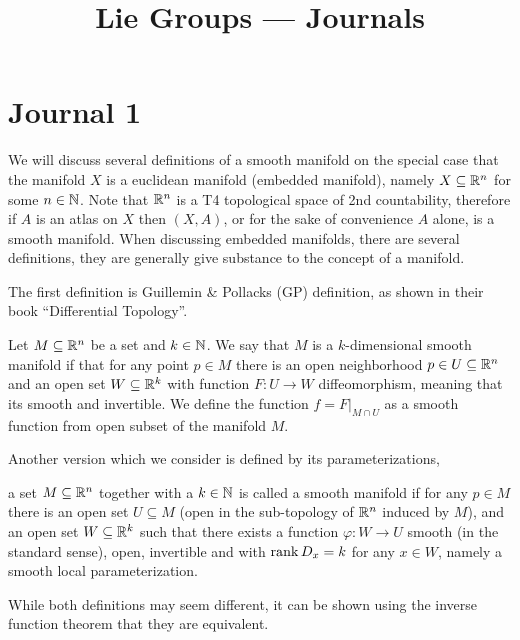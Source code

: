 
\title{Lie Groups --- Journals}
\setcounter{secnumdepth}{2}

\usepackage{fancyhdr}
\pagestyle{fancy}
\renewcommand{\headrulewidth}{0pt}

\DeclareMathOperator{\SU}{SU}


\maketitle
\maketitleprint[teal]{}

\section{Journal 1}
We will discuss several definitions of a smooth manifold on the special case that the manifold $X$ is a euclidean manifold (embedded manifold), namely $X \subseteq \mathbb{R}^n$ for some $n \in \mathbb{N}$.
Note that $\mathbb{R}^n$ is a T4 topological space of 2nd countability, therefore if $A$ is an atlas on $X$ then $(X, A)$, or for the sake of convenience $A$ alone, is a smooth manifold.
When discussing embedded manifolds, there are several definitions, they are generally give substance to the concept of a manifold.

The first definition is Guillemin \& Pollacks (GP) definition, as shown in their book ``Differential Topology''.
\begin{definition}
	Let $M \subseteq \mathbb{R}^n$ be a set and $k \in \mathbb{N}$.
	We say that $M$ is a $k$-dimensional smooth manifold if that for any point $p \in M$ there is an open neighborhood $p \in U \subseteq \mathbb{R}^n$ and an open set $W \subseteq \mathbb{R}^k$ with function $F : U \to W$ diffeomorphism,
	meaning that its smooth and invertible. We define the function $f = F|_{M \cap U}$ as a smooth function from open subset of the manifold $M$.
\end{definition}
Another version which we consider is defined by its parameterizations,
\begin{definition}
	a set $M \subseteq \mathbb{R}^n$ together with a $k \in \mathbb{N}$ is called a smooth manifold if for any $p \in M$ there is an open set $U \subseteq M$ (open in the sub-topology of $\mathbb{R}^n$ induced by $M$),
	and an open set $W \subseteq \mathbb{R}^k$ such that there exists a function $\varphi : W \to U$ smooth (in the standard sense), open, invertible and with $\operatorname{rank} D_x = k$ for any $x \in W$, namely a smooth local parameterization.
\end{definition}
While both definitions may seem different, it can be shown using the inverse function theorem that they are equivalent.

